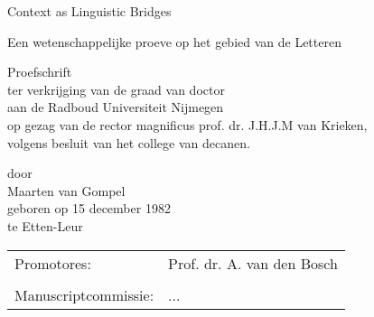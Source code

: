 \documentclass[11pt,makeidx,english]{style/phdthesis}
\author{Maarten van Gompel}
\theoremstyle{break}
\begin{document}
\frontmatter

\pagestyle{plain}



\begin{titlepage}
\begin{center}
\vspace{8cm}
{\Huge Context as Linguistic Bridges}


\vspace{1cm}
Een wetenschappelijke proeve op het gebied van de Letteren

\vspace{6cm}
{\LARGE Proefschrift }\\
\vspace{1cm}
ter verkrijging van de graad van doctor\\
aan de Radboud Universiteit Nijmegen\\
op gezag van de rector magnificus prof. dr. J.H.J.M van Krieken,\\
volgens besluit van het college van decanen.\\

\vspace{2cm}

door\\
\vspace{1cm}
{\LARGE Maarten van Gompel}\\
\vspace{0.5cm}
geboren op 15 december 1982\\
te Etten-Leur


\vspace{0.5cm}


\end{center}

\clearpage

\thispagestyle{empty}
\begin{tabular}{ll}
Promotores: & Prof. dr. A. van den Bosch \\
 & \\
Manuscriptcommissie: & ... \\
\end{tabular}
\end{titlepage}



\tableofcontents


%

\mainmatter
\pagestyle{headings}













\end{document}
